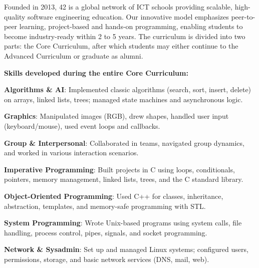 \documentclass[11pt]{article}
\begin{document}
{{{{	

\vspace{0.5cm}

\fontsize{11}{13}\selectfont
\begin{flushleft}
	Founded in 2013, 42 is a global network of ICT schools providing scalable, high-quality software engineering education.
	Our innovative model emphasizes peer-to-peer learning, project-based and hands-on programming, enabling students to become industry-ready within 2 to 5 years.
	The curriculum is divided into two parts: the Core Curriculum, after which students may either continue to the Advanced Curriculum or graduate as alumni.
	
\end{flushleft}

\vspace{0.5em}

\noindent\textbf{Skills developed during the entire Core Curriculum:}
\vspace{0.5em}

\noindent \textbf{Algorithms \& AI}: Implemented classic algorithms (search, sort, insert, delete) on arrays, linked lists, trees; managed state machines and asynchronous logic.

\noindent \textbf{Graphics}: Manipulated images (RGB), drew shapes, handled user input (keyboard/mouse), used event loops and callbacks.

\noindent \textbf{Group \& Interpersonal}: Collaborated in teams, navigated group dynamics, and worked in various interaction scenarios.

\noindent \textbf{Imperative Programming}: Built projects in C using loops, conditionals, pointers, memory management, linked lists, trees, and the C standard library.

\noindent \textbf{Object-Oriented Programming}: Used C++ for classes, inheritance, abstraction, templates, and memory-safe programming with STL.

\noindent \textbf{System Programming}: Wrote Unix-based programs using system calls, file handling, process control, pipes, signals, and socket programming.

\noindent \textbf{Network \& Sysadmin}: Set up and managed Linux systems; configured users, permissions, storage, and basic network services (DNS, mail, web).

}}}}
\end{document}
